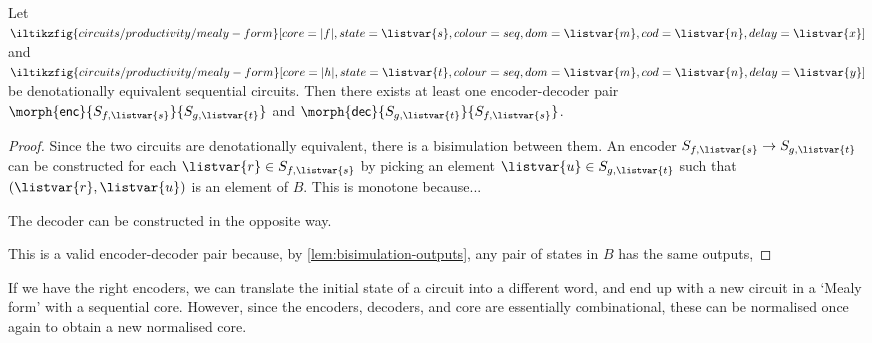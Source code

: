 \begin{theorem}\label{lem:posssible-encoding}
    Let \(
    \iltikzfig{circuits/productivity/mealy-form}[core=|f|,state=\listvar{s},colour=seq,dom=\listvar{m},cod=\listvar{n},delay=\listvar{x}]
    \) and \(
    \iltikzfig{circuits/productivity/mealy-form}[core=|h|,state=\listvar{t},colour=seq,dom=\listvar{m},cod=\listvar{n},delay=\listvar{y}]
    \) be denotationally equivalent sequential circuits.
    Then there exists at least one encoder-decoder pair \(
    \morph{\mathsf{enc}}{S_{f,\listvar{s}}}{S_{g,\listvar{t}}}
    \) and \(
    \morph{\mathsf{dec}}{S_{g,\listvar{t}}}{S_{f,\listvar{s}}}
    \).
\end{theorem}
\begin{proof}
    Since the two circuits are denotationally equivalent, there is a
    bisimulation between them.
    An encoder \(S_{f,\listvar{s}} \to S_{g,\listvar{t}}\) can be constructed
    for each \(\listvar{r} \in S_{f,\listvar{s}}\) by picking an element
    \(\listvar{u} \in S_{g,\listvar{t}}\) such that
    \((\listvar{r}, \listvar{u})\) is an element of \(B\).
    This is monotone because...

    The decoder can be constructed in the opposite way.

    This is a valid encoder-decoder pair because, by
    \cref{lem:bisimulation-outputs}, any pair of states in \(B\) has the same
    outputs,
\end{proof}

If we have the right encoders, we can translate the initial state of a circuit
into a different word, and end up with a new circuit in a `Mealy form' with a
sequential core.
However, since the encoders, decoders, and core are essentially combinational,
these can be normalised once again to obtain a new normalised core.
